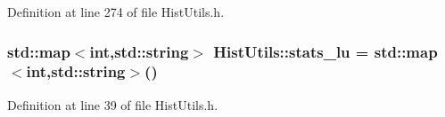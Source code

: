Definition at line 274 of file Hist\+Utils.\+h.

\subsubsection[{\texorpdfstring{stats\+\_\+lu}{stats_lu}}]{\setlength{\rightskip}{0pt plus 5cm}std\+::map$<$int,std\+::string$>$ Hist\+Utils\+::stats\+\_\+lu = std\+::map$<$int,std\+::string$>$()\hspace{0.3cm}{\ttfamily [static]}}\hypertarget{namespaceHistUtils_aa3bb9be93085f86cfa38e98f525f525b}{}\label{namespaceHistUtils_aa3bb9be93085f86cfa38e98f525f525b}


Definition at line 39 of file Hist\+Utils.\+h.

